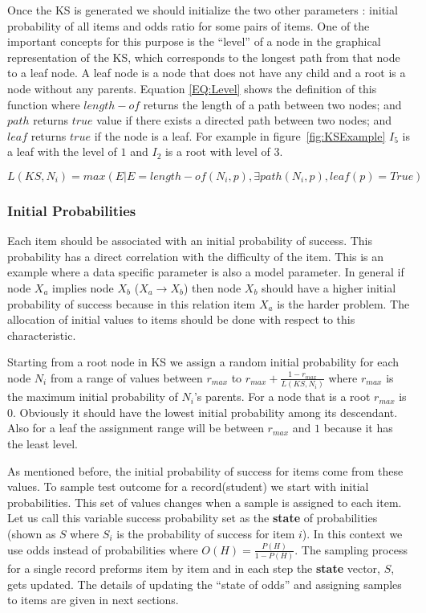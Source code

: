 Once the KS is generated we should initialize the two other parameters : initial probability of all items and odds ratio for some pairs of items. One of the important concepts for this purpose is the ``level'' of a node in the graphical representation of the KS, which corresponds to the longest path from that node to a leaf node. A leaf node is a node that does not have any child and a root is a node without any parents. Equation \ref{EQ:Level} shows the definition of this function where $length-of$ returns the length of a path between two nodes; and $path$ returns $true$ value if there exists a directed path between two nodes; and $leaf$ returns $true$ if the node is a leaf. For example in figure~\ref{fig:KSExample} $I_{5}$ is a leaf with the level of $1$ and $I_{2}$ is a root with level of $3$.

\begin{equation}
L(KS,N_{i}) = max(E|E=length-of(N_{i},p)  ,  \exists path(N_{i},p)  , leaf(p)=True)
\label{EQ:Level}
\end{equation}

\subsubsection{Initial Probabilities}

Each item should be associated with an initial probability of success. This probability has a direct correlation with the difficulty of the item. This is an example where a data specific parameter is also a model parameter. In general if node $X_a$ implies node $X_b$ ($X_a \rightarrow X_b$) then node $X_b$ should have a higher initial probability of success because in this relation item $X_a$ is the harder problem. The allocation of initial values to items should be done with respect to this characteristic. 

Starting from a root node in KS we assign a random initial probability for each node $N_{i}$ from a range of values between $r_{max}$ to $r_{max}+\frac{1-r_{max}}{L(KS,N_{i})}$ where $r_{max}$ is the maximum initial probability of $N_{i}$'s parents. For a node that is a root $r_{max}$ is $0$. Obviously it should have the lowest initial probability among its descendant. Also for a leaf the assignment range will be between $r_{max}$ and $1$ because it has the least level. 


As mentioned before, the initial probability of success for items come from these values. To sample test outcome for a record(student) we start with initial probabilities. This set of values changes when a sample is assigned to each item. Let us call this variable success probability set as the \textbf{state} of probabilities (shown as $S$ where $S_i$ is the probability of success for item $i$). In this context we use odds instead of probabilities where $O(H) = \frac{P(H)}{1-P(H)}$. The sampling process for a single record preforms item by item and in each step the \textbf{state} vector, $S$, gets updated. The details of updating the ``state of odds'' and assigning samples to items are given in next sections.

